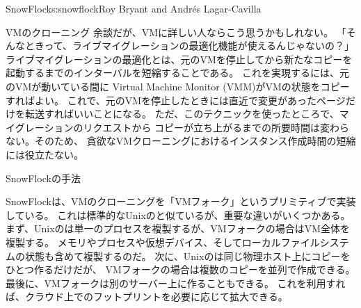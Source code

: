 \begin{aosachapter}{SnowFlock}{s:snowflock}{Roy Bryant and Andr\'e{s} Lagar-Cavilla}
\begin{aosasect1}{VMのクローニング}
余談だが、VMに詳しい人ならこう思うかもしれない。
「そんなときって、ライブマイグレーションの最適化機能が使えるんじゃないの？」
ライブマイグレーションの最適化とは、元のVMを停止してから新たなコピーを
起動するまでのインターバルを短縮することである。
これを実現するには、元のVMが動いている間に
Virtual Machine Monitor (VMM)がVMの状態をコピーすればよい。
これで、元のVMを停止したときには直近で変更があったページだけを転送すればいいことになる。
ただ、このテクニックを使ったところで、マイグレーションのリクエストから
コピーが立ち上がるまでの所要時間は変わらない。そのため、
貪欲なVMクローニングにおけるインスタンス作成時間の短縮には役立たない。

\end{aosasect1}

\begin{aosasect1}{SnowFlockの手法}

SnowFlockは、VMのクローニングを「VMフォーク」というプリミティブで実装している。
これは標準的なUnixのと似ているが、重要な違いがいくつかある。
まず、Unixのは単一のプロセスを複製するが、VMフォークの場合はVM全体を複製する。
メモリやプロセスや仮想デバイス、そしてローカルファイルシステムの状態も含めて複製するのだ。
次に、Unixのは同じ物理ホスト上にコピーをひとつ作るだけだが、
VMフォークの場合は複数のコピーを並列で作成できる。
最後に、VMフォークは別のサーバー上に作ることもできる。
これを利用すれば、クラウド上でのフットプリントを必要に応じて拡大できる。


\end{aosasect1}
\end{aosachapter}
